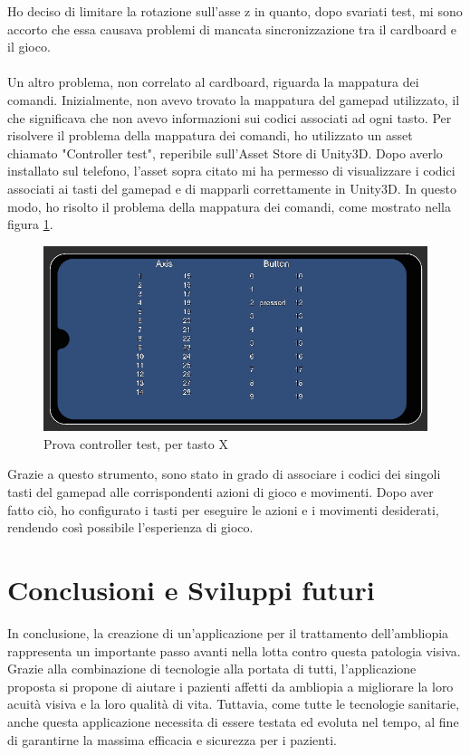 \documentclass[
a4paper,
cleardoublepage=empty,
headings=twolinechapter,
numbers=autoenddot,
]{scrbook}
\begin{document}
    Ho deciso di limitare la rotazione sull'asse z in quanto, dopo svariati test, mi sono accorto che essa causava problemi di mancata sincronizzazione tra il cardboard e il gioco.\\\\
    Un altro problema, non correlato al cardboard, riguarda la mappatura dei comandi. Inizialmente, non avevo trovato la mappatura del gamepad utilizzato, il che significava che non avevo informazioni sui codici associati ad ogni tasto.
    Per risolvere il problema della mappatura dei comandi, ho utilizzato un asset chiamato "Controller test"\cite{Controller_test}, reperibile sull'Asset Store di Unity3D. Dopo averlo installato sul telefono, l'asset sopra citato mi ha permesso di visualizzare i codici associati ai tasti del gamepad e di mapparli correttamente in Unity3D. In questo modo, ho risolto il problema della mappatura dei comandi, come mostrato nella figura \ref{fig:controller_test}.
    \begin{figure}[H]
    	\centering
    	\includegraphics[width=0.7\linewidth]{image/controller_test}
    	\caption{Prova controller test, per tasto X}
    	\label{fig:controller_test}
    \end{figure}
    Grazie a questo strumento, sono stato in grado di associare i codici dei singoli tasti del gamepad alle corrispondenti azioni di gioco e movimenti. Dopo aver fatto ciò, ho configurato i tasti per eseguire le azioni e i movimenti desiderati, rendendo così possibile l'esperienza di gioco.
    \chapter{Conclusioni e Sviluppi futuri}
   In conclusione, la creazione di un'applicazione per il trattamento dell'ambliopia rappresenta un importante passo avanti nella lotta contro questa patologia visiva. Grazie alla combinazione di tecnologie alla portata di tutti, l'applicazione proposta si propone di aiutare i pazienti affetti da ambliopia a migliorare la loro acuità visiva e la loro qualità di vita. Tuttavia, come tutte le tecnologie sanitarie, anche questa applicazione necessita di essere testata ed evoluta nel tempo, al fine di garantirne la massima efficacia e sicurezza per i pazienti.\\\\
   
\end{document}
